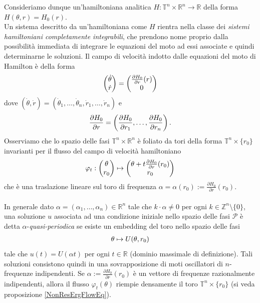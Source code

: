 \documentclass[twoside, 11pt]{amsbook}
\newcommand{\0}{{(0)}}
\newcommand{\3}{{(3)}}
\theoremstyle{colonplain}
\theoremstyle{colondefinition}
\theoremstyle{colonremark}
\numberwithin{equation}{chapter}
\begin{document}
Consideriamo dunque un'hamiltoniana analitica $H : \mathbb{T}^n \times \mathbb{R}^n \longrightarrow \mathbb{R}$ della forma $H(\theta, r) = H_0(r)$. \\
Un sistema descritto da un'hamiltoniana come $H$ rientra nella classe dei \textit{sistemi hamiltoniani completamente integrabili}, che prendono nome proprio dalla possibilità immediata di integrare le equazioni del moto ad essi associate e quindi determinarne le soluzioni. Il campo di velocità indotto dalle equazioni del moto di Hamilton è della forma
\begin{align}
    \begin{pmatrix}
        \dot{\theta} \\
        \dot{r}
    \end{pmatrix} = \begin{pmatrix}
        \frac{\partial H_0}{\partial r}(r) \\
        0
    \end{pmatrix} \notag
\end{align}
dove $(\dot{\theta}, \dot{r}) = (\dot{\theta}_1, \dots, \dot{\theta}_n, \dot{r}_1, \dots, \dot{r}_n)$ e
\begin{align}
    \frac{\partial H_0}{\partial r} = \left(\frac{\partial H_0}{\partial r_1}, \dots, \frac{\partial H_0}{\partial r_n}\right). \notag
\end{align}
Osserviamo che lo spazio delle fasi $\mathbb{T}^n \times \mathbb{R}^n$ è foliato da tori della forma $\mathbb{T}^n \times \{r_0\}$ invarianti per il flusso del campo di velocità hamiltoniano
\begin{align}
    \varphi_t : \begin{pmatrix}
        \theta \\
        r_0
    \end{pmatrix} \mapsto \begin{pmatrix}
        \theta + t\frac{\partial H_0}{\partial r}(r_0) \\
        r_0
    \end{pmatrix} \notag
\end{align}
che è una traslazione lineare sul toro di frequenza $\alpha = \alpha(r_0) := \frac{\partial H_0}{\partial r}(r_0)$. \\ \\
In generale dato $\alpha = (\alpha_1, \dots, \alpha_n) \in \mathbb{R}^n$ tale che $k \cdot \alpha \neq 0$ per ogni $k \in \mathbb{Z}^n \setminus \{0\}$, una soluzione $u$ associata ad una condizione iniziale nello spazio delle fasi $\mathcal{P}$ è detta $\alpha$-\textit{quasi-periodica} se esiste un embedding del toro nello spazio delle fasi
\begin{align}
    \theta \mapsto U(\theta, r_0) \notag
\end{align}
tale che $u(t) = U(\alpha t)$ per ogni $t \in \mathbb{R}$ (dominio massimale di definizione). 
Tali soluzioni consistono quindi in una sovrapposizione di moti oscillatori di $n$-frequenze indipendenti. 
Se $\alpha := \frac{\partial H_0}{\partial r}(r_0)$ è un vettore di frequenze razionalmente indipendenti, allora il flusso $\varphi_t (\theta)$ riempie densamente il toro $\mathbb{T}^n\times\{r_0\}$ (si veda proposizione \ref{NonResErgFlowEq}).
\end{document}
